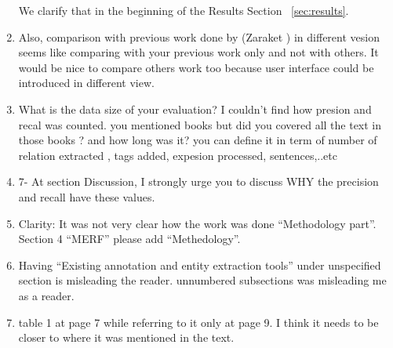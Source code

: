 \begin{enumerate}[leftmargin=0mm,label=\bfseries CommentR3.\arabic*]
{We clarify that in the beginning of the Results Section ~\ref{sec:results}.
}


\item \label{Review.3.24}
Also, comparison with previous work done by (Zaraket ) 
in different vesion seems like comparing with your previous work 
only and not with others. 
It would be nice to compare others work too because user 
interface could be introduced in different view.


\item \label{Review.3.24}
What is the data size of your evaluation? 
I couldn't find how presion and recal was counted. 
you mentioned books but did you covered all the text in those 
books ? and how long was it? you can define it in term of 
number of relation extracted , tags added, expesion processed, 
sentences,..etc




\item \label{Review.3.24}
7- At section Discussion, I strongly urge you to discuss 
WHY the precision and recall have these values.


\item \label{Review.3.25}
Clarity:  
It was not very clear how the work was done 
``Methodology part''. 
Section 4 ``MERF'' please add ``Methedology''.



\item \label{Review.3.25}
Having ``Existing annotation and entity extraction tools'' 
under unspecified section is misleading the reader. 
unnumbered subsections was misleading me as a reader. 


\item \label{Review.3.25}
table 1 at page 7 while referring to it only at page 9. 
I think it needs to be closer to where it was mentioned in the text. 


\end{enumerate}
